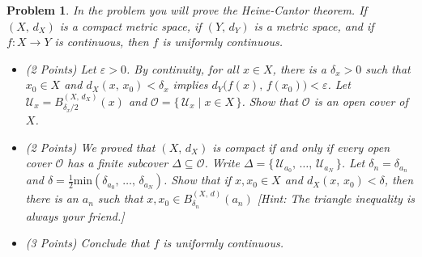 \documentclass{article}
\theoremstyle{normal}
\newtheorem{problem}{Problem}
\begin{document}
\begin{problem}
        In the problem you will prove the \textit{Heine-Cantor theorem}.
        If $(X,\,d_{X})$ is a compact metric space, if $(Y,\,d_{Y})$ is a
        metric space, and if $f:X\rightarrow{Y}$ is continuous, then $f$ is
        uniformly continuous.
        \begin{itemize}
            \item (2 Points)
                Let $\varepsilon>0$. By continuity, for all $x\in{X}$, there
                is a $\delta_{x}>0$ such that $x_{0}\in{X}$ and
                $d_{X}(x,\,x_{0})<\delta_{x}$ implies
                $d_{Y}\big(f(x),\,f(x_{0})\big)<\varepsilon$.
                Let $\mathcal{U}_{x}=B_{\delta_{x}/2}^{(X,\,d_{X})}(x)$ and
                $\mathcal{O}=\{\,\mathcal{U}_{x}\;|\;x\in{X}\,\}$. Show that
                $\mathcal{O}$ is an open cover of $X$.
            \item (2 Points) We proved that $(X,\,d_{X})$ is compact
                if and only if every
                open cover $\mathcal{O}$ has a finite subcover
                $\Delta\subseteq\mathcal{O}$. Write
                $\Delta=\{\,\mathcal{U}_{a_{0}},\,\dots,\,\mathcal{U}_{a_{N}}\,\}$.
                Let $\delta_{n}=\delta_{a_{n}}$ and
                $\delta=\frac{1}{2}\textrm{min}(\delta_{a_{0}},\,\dots,\,\delta_{a_{N}})$.
                Show that if $x,x_{0}\in{X}$ and
                $d_{X}(x,\,x_{0})<\delta$, then there is an
                $a_{n}$ such that $x,x_{0}\in{B}_{\delta_{n}}^{(X,\,d)}(a_{n})$
                [Hint: The triangle inequality is always your friend.]
            \item (3 Points) Conclude that $f$ is uniformly continuous.
        \end{itemize}
    \end{problem}
    \clearpage
\end{document}
